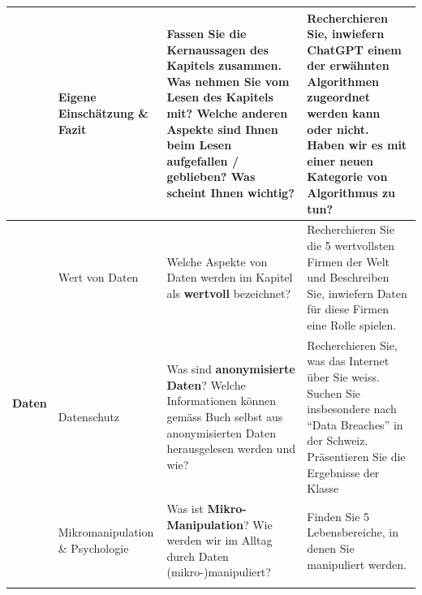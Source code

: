 \begin{landscape}
\begin{longtable}{@{}r|p{5.3cm}||p{10cm}|p{10cm}@{}}
		                              & Eigene Einschätzung \& Fazit          & Fassen Sie die \textbf{Kernaussagen} des Kapitels zusammen. Was nehmen Sie vom Lesen des Kapitels mit? Welche anderen Aspekte sind Ihnen beim Lesen aufgefallen / geblieben? Was scheint Ihnen wichtig?                                                                                                                                                                              & Recherchieren Sie, inwiefern ChatGPT einem der erwähnten Algorithmen zugeordnet werden kann oder nicht. Haben wir es mit einer neuen Kategorie von Algorithmus zu tun?                                                                                                           \\\midrule\midrule
		\multirow{5}{*}{\textbf{Daten}}        & Wert von Daten                        & Welche Aspekte von Daten werden im Kapitel als \textbf{wertvoll} bezeichnet?                                                                                                                                                                                                                                                                                                         & Recherchieren Sie die 5 wertvollsten Firmen der Welt und Beschreiben Sie, inwiefern Daten für diese Firmen eine Rolle spielen.                                                                                                                                                   \\\cmidrule(l){2-4}
		                              & Datenschutz                           & Was sind \textbf{anonymisierte Daten}? Welche Informationen können gemäss Buch selbst aus anonymisierten Daten herausgelesen werden und wie?                                                                                                                                                                                                                                                 & Recherchieren Sie, was das Internet über Sie weiss. Suchen Sie insbesondere nach \enquote{Data Breaches} in der Schweiz. Präsentieren Sie die Ergebnisse der Klasse                                                                                                                    \\\cmidrule(l){2-4}
		                              & Mikromanipulation \& Psychologie      & Was ist \textbf{Mikro-Manipulation}? Wie werden wir im Alltag durch Daten (mikro-)manipuliert?                                                                                                                                                                                                                                                                                       & Finden Sie 5 Lebensbereiche, in denen Sie manipuliert werden.                                                                                                                                                                                                                    \\\cmidrule(l){2-4}

\end{longtable}
\end{landscape}

